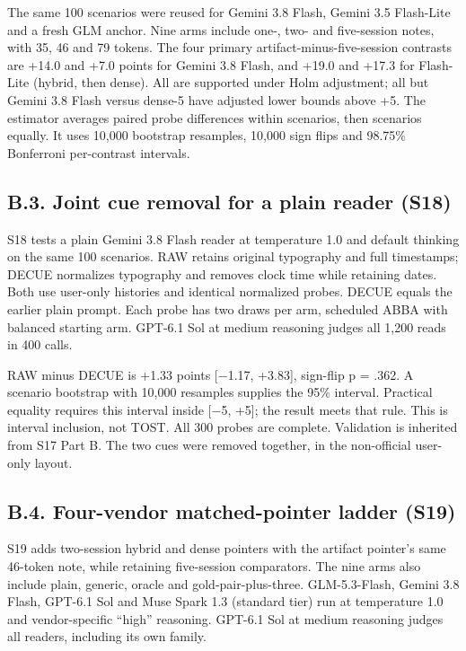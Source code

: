 \documentclass[11pt]{article}
\begin{document}
The same 100 scenarios were reused for Gemini 3.8 Flash, Gemini 3.5 Flash-Lite and a fresh GLM anchor. Nine arms include one-, two- and five-session notes, with 35, 46 and 79 tokens. The four primary artifact-minus-five-session contrasts are +14.0 and +7.0 points for Gemini 3.8 Flash, and +19.0 and +17.3 for Flash-Lite (hybrid, then dense). All are supported under Holm adjustment; all but Gemini 3.8 Flash versus dense-5 have adjusted lower bounds above +5. The estimator averages paired probe differences within scenarios, then scenarios equally. It uses 10,000 bootstrap resamples, 10,000 sign flips and 98.75\% Bonferroni per-contrast intervals.

\subsection{B.3. Joint cue removal for a plain reader (S18)}\label{b.3.-joint-cue-removal-for-a-plain-reader-s18}

S18 tests a plain Gemini 3.8 Flash reader at temperature 1.0 and default thinking on the same 100 scenarios. RAW retains original typography and full timestamps; DECUE normalizes typography and removes clock time while retaining dates. Both use user-only histories and identical normalized probes. DECUE equals the earlier plain prompt. Each probe has two draws per arm, scheduled ABBA with balanced starting arm. GPT-6.1 Sol at medium reasoning judges all 1,200 reads in 400 calls.

RAW minus DECUE is +1.33 points {[}−1.17, +3.83{]}, sign-flip p = .362. A scenario bootstrap with 10,000 resamples supplies the 95\% interval. Practical equality requires this interval inside {[}−5, +5{]}; the result meets that rule. This is interval inclusion, not TOST. All 300 probes are complete. Validation is inherited from S17 Part B. The two cues were removed together, in the non-official user-only layout.

\subsection{B.4. Four-vendor matched-pointer ladder (S19)}\label{b.4.-four-vendor-matched-pointer-ladder-s19}

S19 adds two-session hybrid and dense pointers with the artifact pointer's same 46-token note, while retaining five-session comparators. The nine arms also include plain, generic, oracle and gold-pair-plus-three. GLM-5.3-Flash, Gemini 3.8 Flash, GPT-6.1 Sol and Muse Spark 1.3 (standard tier) run at temperature 1.0 and vendor-specific ``high'' reasoning. GPT-6.1 Sol at medium reasoning judges all readers, including its own family.
\end{document}

